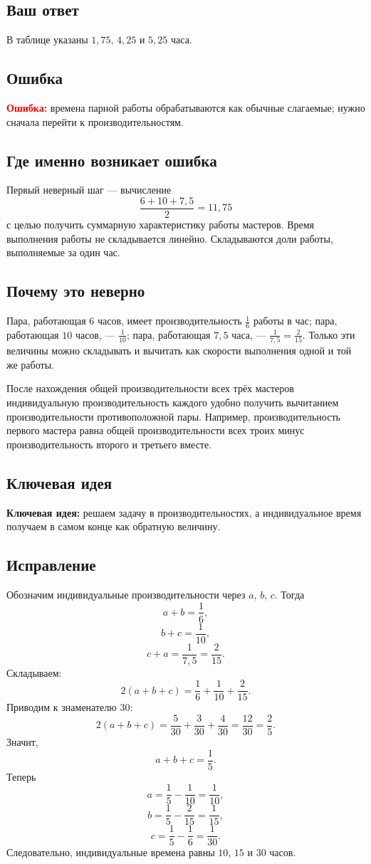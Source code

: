 \documentclass[12pt,a4paper]{article}
\newcommand{\err}{\textcolor{red}{\textbf{Ошибка:}}}
\newcommand{\idea}{\textcolor{blue!60!black}{\textbf{Ключевая идея:}}}
\begin{document}
\subsection*{Ваш ответ}
В таблице указаны $1{,}75$, $4{,}25$ и $5{,}25$ часа.

\subsection*{Ошибка}
\err{} времена парной работы обрабатываются как обычные слагаемые; нужно сначала перейти к производительностям.

\subsection*{Где именно возникает ошибка}
Первый неверный шаг --- вычисление
\[
\frac{6+10+7{,}5}{2}=11{,}75
\]
с целью получить суммарную характеристику работы мастеров. Время выполнения работы не складывается линейно. Складываются доли работы, выполняемые за один час.

\subsection*{Почему это неверно}
Пара, работающая $6$ часов, имеет производительность $\frac16$ работы в час; пара, работающая $10$ часов, --- $\frac1{10}$; пара, работающая $7{,}5$ часа, --- $\frac1{7{,}5}=\frac2{15}$. Только эти величины можно складывать и вычитать как скорости выполнения одной и той же работы.

После нахождения общей производительности всех трёх мастеров индивидуальную производительность каждого удобно получить вычитанием производительности противоположной пары. Например, производительность первого мастера равна общей производительности всех троих минус производительность второго и третьего вместе.

\subsection*{Ключевая идея}
\idea{} решаем задачу в производительностях, а индивидуальное время получаем в самом конце как обратную величину.

\subsection*{Исправление}
Обозначим индивидуальные производительности через $a$, $b$, $c$. Тогда
\[
a+b=\frac16,
\]
\[
b+c=\frac1{10},
\]
\[
c+a=\frac1{7{,}5}=\frac2{15}.
\]
Складываем:
\[
2(a+b+c)=\frac16+\frac1{10}+\frac2{15}.
\]
Приводим к знаменателю $30$:
\[
2(a+b+c)=\frac5{30}+\frac3{30}+\frac4{30}=\frac{12}{30}=\frac25.
\]
Значит,
\[
a+b+c=\frac15.
\]
Теперь
\[
a=\frac15-\frac1{10}=\frac1{10},
\]
\[
b=\frac15-\frac2{15}=\frac1{15},
\]
\[
c=\frac15-\frac16=\frac1{30}.
\]
Следовательно, индивидуальные времена равны $10$, $15$ и $30$ часов.
\end{document}
